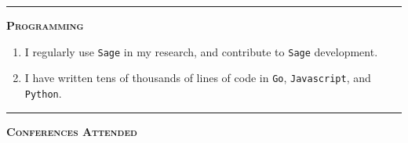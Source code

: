 \documentclass[12pt]{article}
\newcommand{\sectionheading}[1]
{
\bigskip %
\noindent
\hspace{-6.5mm}\textcolor{Gray}{\rule[.75mm]{21.5mm}{1mm}} %
\hspace{.2mm}	%
{\large{\textbf{\textsc{#1}}}} %
}
\newenvironment{date_section}
	{
	\vspace{-1ex}
	\leftmargini = 15ex
		\begin{itemize}[
			labelsep = *,
			labelwidth = 9ex,
			labelindent = 0ex,
			itemindent = !,
			font=\normalfont,
			align=parleft
		]{}
		\itemsep=-1.5mm
	}
	{\end{itemize}\vspace{-2ex}}
\newcommand{\yearmo}[2]{
	\item[
		{\makebox[1ex][r]{#1}}
		\hspace{1ex}
		{\makebox[1ex][l]{#2} }
		] }
\begin{document}
	\sectionheading{Programming}%
	
	\begin{enumerate}[label=$\bullet$]
		\item I regularly use {\tt Sage} in my research, and contribute to {\tt Sage} development.
		\item I have written tens of thousands of lines of code in {\tt Go}, {\tt Javascript}, and {\tt Python}.
	\end{enumerate}



%	
%
%		
%			
%			
%			
%			
%			
%		


	\sectionheading{Conferences Attended} %
	
\end{document}
